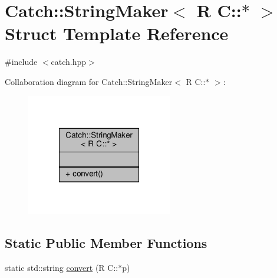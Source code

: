 \hypertarget{struct_catch_1_1_string_maker_3_01_r_01_c_1_1_5_01_4}{\section{Catch\-:\-:String\-Maker$<$ R C\-:\-:$\ast$ $>$ Struct Template Reference}
\label{struct_catch_1_1_string_maker_3_01_r_01_c_1_1_5_01_4}
}


{\ttfamily \#include $<$catch.\-hpp$>$}



Collaboration diagram for Catch\-:\-:String\-Maker$<$ R C\-:\-:$\ast$ $>$\-:
\nopagebreak
\begin{figure}[H]
\begin{center}
\leavevmode
\includegraphics[width=180pt]{struct_catch_1_1_string_maker_3_01_r_01_c_1_1_5_01_4__coll__graph}
\end{center}
\end{figure}
\subsection*{Static Public Member Functions}
\begin{DoxyCompactItemize}
\item 
static std\-::string \hyperlink{struct_catch_1_1_string_maker_3_01_r_01_c_1_1_5_01_4_af69c15e0b406e945777137fe4a333731}{convert} (R C\-::$\ast$p)
\end{DoxyCompactItemize}


